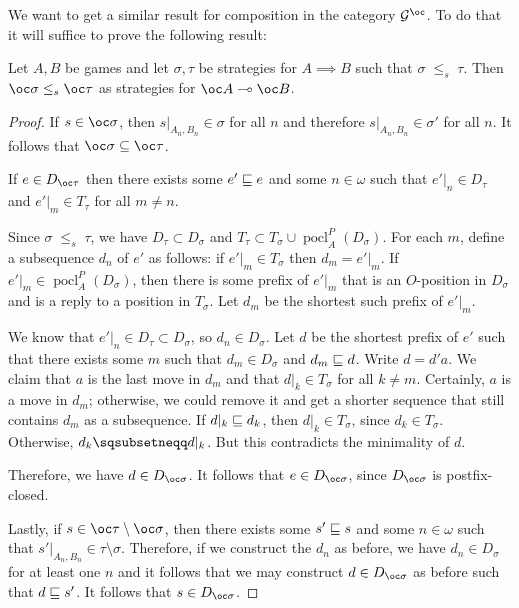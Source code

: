 \documentclass{article}
\newcommand{\stle}{{\;\le_s\;}}
\DeclareMathOperator{\pocl}{pocl}
\begin{document}
We want to get a similar result for composition in the category $\G^{\oc}$.  To do that it will suffice to prove the following result:

\begin{proposition}
  Let $A,B$ be games and let $\sigma,\tau$ be strategies for $A\implies B$ such that $\sigma\stle\tau$.  Then $\oc\sigma\stle\oc\tau$ as strategies for $\oc A\implies \oc B$.
  \begin{proof}
    If $s\in\oc\sigma$, then $s\vert_{A_n,B_n}\in\sigma$ for all $n$ and therefore $s\vert_{A_n,B_n}\in\sigma'$ for all $n$.  It follows that $\oc\sigma\subset\oc\tau$.

    If $e\in D_{\oc\tau}$ then there exists some $e'\sqsubseteq e$ and some $n\in\omega$ such that $e'\vert_n\in D_\tau$ and $e'\vert_m\in T_\tau$ for all $m\ne n$.  

    Since $\sigma\stle\tau$, we have $D_\tau\subset D_\sigma$ and $T_\tau\subset T_\sigma\cup \pocl_A^P(D_\sigma)$.  For each $m$, define a subsequence $d_n$ of $e'$ as follows: if $e'\vert_m\in T_\sigma$ then $d_m=e'\vert_m$.  If $e'\vert_m\in \pocl_A^P(D_\sigma)$, then there is some prefix of $e'\vert_m$ that is an $O$-position in $D_\sigma$ and is a reply to a position in $T_\sigma$.  Let $d_m$ be the shortest such prefix of $e'\vert_m$.

    We know that $e'\vert_n\in D_\tau\subset D_\sigma$, so $d_n\in D_\sigma$.  Let $d$ be the shortest prefix of $e'$ such that there exists some $m$ such that $d_m\in D_\sigma$ and $d_m\sqsubseteq d$.  Write $d=d'a$.  We claim that $a$ is the last move in $d_m$ and that $d\vert_k\in T_\sigma$ for all $k\neq m$.  Certainly, $a$ is a move in $d_m$; otherwise, we could remove it and get a shorter sequence that still contains $d_m$ as a subsequence.  If $d\vert_k\sqsubseteq d_k$, then $d\vert_k\in T_\sigma$, since $d_k\in T_\sigma$.  Otherwise, $d_k\pprefix d\vert_k$.  But this contradicts the minimality of $d$.  

    Therefore, we have $d\in D_{\oc\sigma}$.  It follows that $e\in D_{\oc\sigma}$, since $D_{\oc\sigma}$ is postfix-closed.

    Lastly, if $s\in \oc\tau\setminus\oc\sigma$, then there exists some $s'\sqsubseteq s$ and some $n\in\omega$ such that $s'\vert_{A_n,B_n}\in\tau\setminus\sigma$.  Therefore, if we construct the $d_n$ as before, we have $d_n\in D_\sigma$ for at least one $n$ and it follows that we may construct $d\in D_{\oc\sigma}$ as before such that $d\sqsubseteq s'$.  It follows that $s\in D_{\oc\sigma}$.  
  \end{proof}
\end{proposition}
\end{document}

